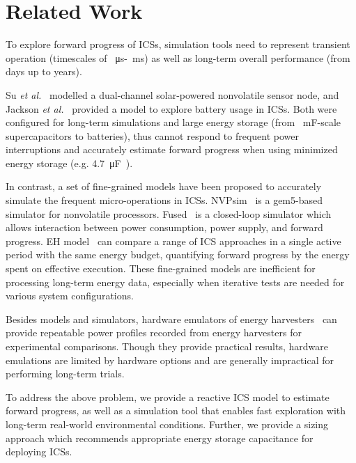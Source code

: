 \section{Related Work} \label{sec:c4_review}

To explore forward progress of ICSs, simulation tools need to represent transient operation (timescales of \SI{}{\micro\second}-\SI{}{\milli\second}) as well as long-term overall performance (from days up to years). 

Su \textit{et al.}~\cite{Su:2019:TFR:3340300.3320270} modelled a dual-channel solar-powered nonvolatile sensor node, and Jackson \textit{et al.}~\cite{Jackson:2019:COC:3302506.3310400} provided a model to explore battery usage in ICSs. Both were configured for long-term simulations and large energy storage (from \SI{}{\milli\farad}-scale supercapacitors to batteries), thus cannot respond to frequent power interruptions and accurately estimate forward progress when using minimized energy storage (e.g. \SI{4.7}{\micro\farad}~\cite{10.1145/3281300}).

In contrast, a set of fine-grained models have been proposed to accurately simulate the frequent micro-operations in ICSs. 
NVPsim~\cite{7428003} is a gem5-based simulator for nonvolatile processors.
Fused~\cite{sliper2020fused} is a closed-loop simulator which allows interaction between power consumption, power supply, and forward progress. EH model~\cite{8574572} can compare a range of ICS approaches in a single active period with the same energy budget, quantifying forward progress by the energy spent on effective execution. These fine-grained models are inefficient for processing long-term energy data, especially when iterative tests are needed for various system configurations. 

Besides models and simulators, hardware emulators of energy harvesters~\cite{10.1145/2668332.2668336, 10.1145/3356250.3360042} can provide repeatable power profiles recorded from energy harvesters for experimental comparisons. Though they provide practical results, hardware emulations are limited by hardware options and are generally impractical for performing long-term trials.

To address the above problem, we provide a reactive ICS model to estimate forward progress, as well as a simulation tool that enables fast exploration with long-term real-world environmental conditions. Further, we provide a sizing approach which recommends appropriate energy storage capacitance for deploying ICSs. 